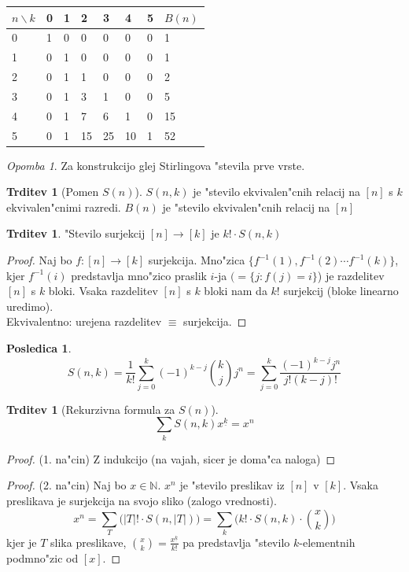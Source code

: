 \documentclass[a4paper,12pt]{article}
\theoremstyle{definition}
\newtheorem{conseq}[counter]{Posledica}
\newtheorem{claim}[counter]{Trditev}
\theoremstyle{remark}
\newtheorem*{rem}{Opomba}
\newcommand{\N}{\mathbb{N}}
\begin{document}
\begin{center}
	\begin{tabular}{l|llllll|l}
	    $n \backslash k$ & 0 & 1  & 2  & 3  & 4  & 5 & $B(n)$ \\
	    \hline
	    0 & 1 & 0  & 0  & 0  & 0  & 0 & 1 \\
	    1 & 0 & 1  & 0  & 0  & 0  & 0 & 1 \\
	    2 & 0 & 1  & 1  & 0  & 0  & 0 & 2 \\
	    3 & 0 & 1  & 3  & 1  & 0  & 0 & 5 \\
	    4 & 0 & 1  & 7  & 6  & 1  & 0 & 15 \\
	    5 & 0 & 1  & 15 & 25 & 10 & 1 & 52
	\end{tabular}
\end{center}

\begin{rem}
	Za konstrukcijo glej Stirlingova "stevila prve vrste.
\end{rem}

\begin{claim}[Pomen $S(n)$]
    $S(n,k)$ je "stevilo ekvivalen"cnih relacij na $[n]$ s $k$ ekvivalen"cnimi razredi. $B(n)$ je "stevilo ekvivalen"cnih relacij na $[n]$
\end{claim}

\begin{claim}
    "Stevilo surjekcij $[n] \rightarrow [k]$ je $k! \cdot S(n,k)$
\end{claim}

\begin{proof}
    Naj bo $f: [n] \rightarrow [k]$ surjekcija.
    Mno"zica $\{f^{-1}(1), f^{-1}(2) \cdots f^{-1}(k)\}$, kjer $f^{-1}(i)$ predstavlja mno"zico praslik $i$-ja $(=\{j: f(j) = i\}$) je razdelitev $[n]$ s $k$ bloki. Vsaka razdelitev $[n]$ s $k$ bloki nam da $k!$ surjekcij
    (bloke linearno uredimo).
    \\
    Ekvivalentno: urejena razdelitev $\equiv$ surjekcija.
\end{proof}

\begin{conseq}
	\[S(n,k) = \frac{1}{k!} \sum_{j=0}^k (-1)^{k-j} \binom{k}{j}j^n = \sum_{j=0}^k \frac{(-1)^{k-j} j^n}{j! (k-j)!}\]
\end{conseq}

\begin{claim}[Rekurzivna formula za $S(n)$]
    \[\sum_k S(n,k)x^{\underline{k}} = x^n\]
\end{claim}

\begin{proof}(1. na"cin)
	Z indukcijo (na vajah, sicer je doma"ca naloga)
\end{proof}
\begin{proof}(2. na"cin)
    Naj bo $x \in \N$.
    $x^n$ je "stevilo preslikav iz $[n]$ v $[k]$.
    Vsaka preslikava je surjekcija na svojo sliko (zalogo vrednosti).
    \[x^n = \sum_T \big(|T|! \cdot S(n,|T|)\big) = \sum_k \big(k! \cdot S(n,k) \cdot \binom{x}{k}\big)\]
    kjer je $T$ slika preslikave, $\binom{x}{k} = \frac{x^{\underline{k}}}{k!}$ pa predstavlja "stevilo $k$-elementnih podmno"zic od $[x]$.
\end{proof}
\end{document}
